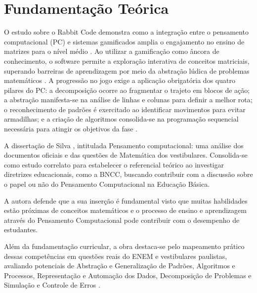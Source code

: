 
\setlength{\parskip}{0.3cm}

\chapter{Fundamentação Teórica}
\label{ch:fundamentacao}

O estudo sobre o Rabbit Code demonstra como a integração entre o pensamento
computacional (PC) e sistemas gamificados amplia o engajamento no ensino de
matrizes para o nível médio \cite{rolim2023rabbit}. Ao utilizar a gamificação
como âncora de conhecimento, o software permite a exploração interativa de
conceitos matriciais, superando barreiras de aprendizagem por meio da abstração
lúdica de problemas matemáticos \cite{rolim2023rabbit}. A progressão no jogo
exige a aplicação obrigatória dos quatro pilares do PC: a decomposição ocorre ao
fragmentar o trajeto em blocos de ação; a abstração manifesta-se na análise de
linhas e colunas para definir a melhor rota; o reconhecimento de padrões é
exercitado ao identificar movimentos para evitar armadilhas; e a criação de
algoritmos consolida-se na programação sequencial necessária para atingir os
objetivos da fase \cite{rolim2023rabbit}.

A dissertação de Silva \cite{silva2020}, intitulada Pensamento computacional:
uma análise dos documentos oficiais e das questões de Matemática dos
vestibulares. Consolida-se como estudo correlato para estabelecer o referencial
teórico ao investigar diretrizes educacionais, como a BNCC, buscando contribuir
com a discussão sobre o papel ou não do Pensamento Computacional na Educação
Básica\cite{silva2020}.
  
A autora defende que a sua inserção é fundamental visto que muitas habilidades
estão próximas de conceitos matemáticos e o processo de ensino e aprendizagem
através do Pensamento Computacional pode contribuir com o desempenho de
estudantes\cite{silva2020}.

Além da fundamentação curricular, a obra destaca-se pelo mapeamento prático
dessas competências em questões reais do ENEM e vestibulares paulistas,
avaliando potenciais de Abstração e Generalização de Padrões, Algoritmos e
Processos, Representação e Automação dos Dados, Decomposição de Problemas e
Simulação e Controle de Erros \cite{silva2020}.

